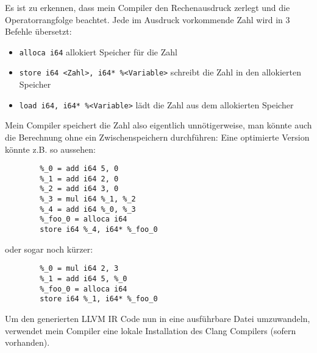     Es ist zu erkennen, dass mein Compiler den Rechenausdruck zerlegt und die Operatorrangfolge beachtet.
    Jede im Ausdruck vorkommende Zahl wird in 3 Befehle übersetzt:
    \begin{itemize}
        \item \texttt{alloca i64} allokiert Speicher für die Zahl
        \item \texttt{store i64 <Zahl>, i64* \%<Variable>} schreibt die Zahl in den allokierten Speicher
        \item \texttt{load i64, i64* \%<Variable>} lädt die Zahl aus dem allokierten Speicher
    \end{itemize}

    Mein Compiler speichert die Zahl also eigentlich unnötigerweise, man könnte auch die Berechnung ohne ein Zwischenspeichern
    durchführen:
    Eine optimierte Version könnte z.B. so aussehen:
    
    \begin{lstlisting}
        %_0 = add i64 5, 0
        %_1 = add i64 2, 0
        %_2 = add i64 3, 0
        %_3 = mul i64 %_1, %_2
        %_4 = add i64 %_0, %_3
        %_foo_0 = alloca i64
        store i64 %_4, i64* %_foo_0
    \end{lstlisting}

    oder sogar noch kürzer:

    \begin{lstlisting}
        %_0 = mul i64 2, 3
        %_1 = add i64 5, %_0
        %_foo_0 = alloca i64
        store i64 %_1, i64* %_foo_0
    \end{lstlisting}

    
    Um den generierten LLVM IR Code nun in eine ausführbare Datei umzuwandeln, 
    verwendet mein Compiler eine lokale Installation des Clang Compilers (sofern vorhanden).


